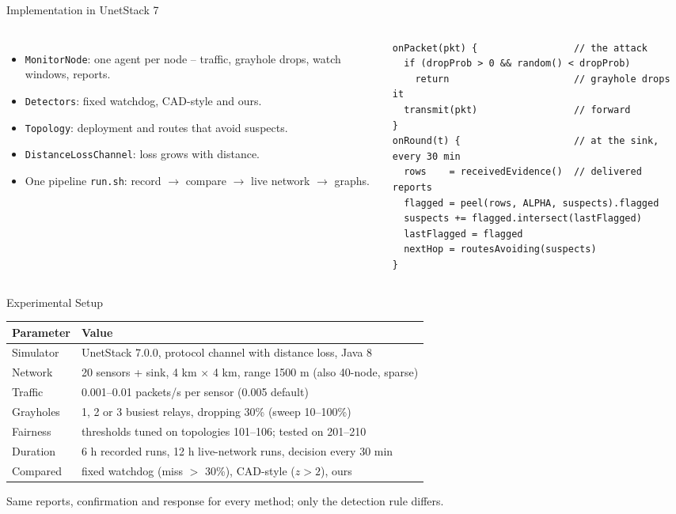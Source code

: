 \documentclass[aspectratio=169,11pt]{beamer}
\begin{document}
\begin{frame}[fragile]{Implementation in UnetStack 7}
  \begin{columns}[T]
      \begin{itemize}\setlength\itemsep{0.4em}
        \item \texttt{MonitorNode}: one agent per node -- traffic, grayhole drops, watch windows, reports.
        \item \texttt{Detectors}: fixed watchdog, CAD-style and ours.
        \item \texttt{Topology}: deployment and routes that avoid suspects.
        \item \texttt{DistanceLossChannel}: loss grows with distance.
        \item One pipeline \texttt{run.sh}: record $\rightarrow$ compare $\rightarrow$ live network $\rightarrow$ graphs.
      \end{itemize}
\begin{lstlisting}
onPacket(pkt) {                 // the attack
  if (dropProb > 0 && random() < dropProb)
    return                      // grayhole drops it
  transmit(pkt)                 // forward
}
onRound(t) {                    // at the sink, every 30 min
  rows    = receivedEvidence()  // delivered reports
  flagged = peel(rows, ALPHA, suspects).flagged
  suspects += flagged.intersect(lastFlagged)
  lastFlagged = flagged
  nextHop = routesAvoiding(suspects)
}
\end{lstlisting}
  \end{columns}
\end{frame}

\begin{frame}{Experimental Setup}
  \centering
  \small
  \renewcommand{\arraystretch}{1.25}
  \begin{tabular}{@{}ll@{}}
    \toprule
    \textbf{Parameter} & \textbf{Value}\\
    \midrule
    Simulator & UnetStack 7.0.0, protocol channel with distance loss, Java 8\\
    Network & 20 sensors + sink, 4 km $\times$ 4 km, range 1500 m (also 40-node, sparse)\\
    Traffic & 0.001--0.01 packets/s per sensor (0.005 default)\\
    Grayholes & 1, 2 or 3 busiest relays, dropping 30\% (sweep 10--100\%)\\
    Fairness & thresholds tuned on topologies 101--106; tested on 201--210\\
    Duration & 6 h recorded runs, 12 h live-network runs, decision every 30 min\\
    Compared & fixed watchdog (miss $>$ 30\%), CAD-style ($z>2$), ours\\
    \bottomrule
  \end{tabular}

  \vspace{0.8em}
  {\small Same reports, confirmation and response for every method; only the detection rule differs.}
\end{frame}
\end{document}
